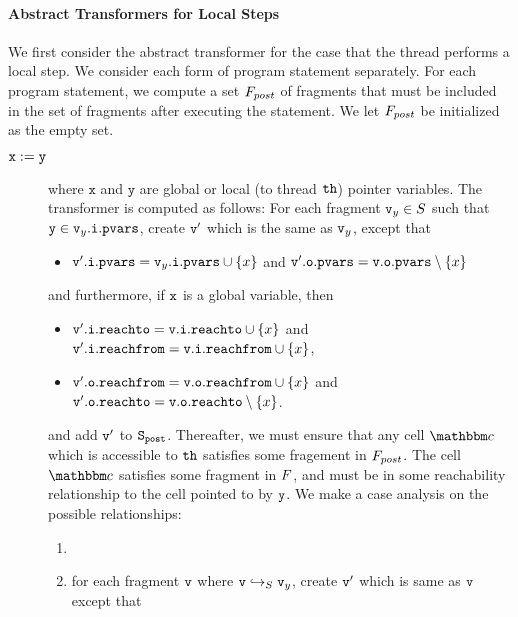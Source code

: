 \paragraph{Abstract Transformers for Local Steps} We first consider
the abstract transformer for the case that the thread performs a local
step.
We consider each form of program statement separately.
For each program statement, we compute a set $F_{post}$  of fragments that
must be included in the set of fragments after executing the statement.
We let $F_{post}$ be initialized as the empty set.
\begin{description}
\item[${\tt x := y}$] where $\mathtt{x}$ and $\mathtt{y}$ are global or local
  (to thread ${\tt th}$) pointer variables.
  The transformer is computed as follows: For each fragment $\mathtt{v}_y \in S$ such that $\mathtt{y} \in \mathtt{v}_y.\mathtt{i}.\mathtt{pvars}$, 
create $\mathtt{v}'$ which is the same as $\mathtt{v}_y$, except that
\begin{itemize}
\item $\mathtt{v}'.\mathtt{i}.\mathtt{pvars} = \mathtt{v}_y.\mathtt{i}.\mathtt{pvars} \cup \left\{x\right\}$ and
  $\mathtt{v}'.\mathtt{o}.\mathtt{pvars} = \mathtt{v}.\mathtt{o}.\mathtt{pvars} \setminus \left\{x\right\}$
\end{itemize}
and furthermore, if $\mathtt{x}$ is a global variable, then
\begin{itemize}
\item $\mathtt{v}'.\mathtt{i}.\mathtt{reachto} = \mathtt{v}.\mathtt{i}.\mathtt{reachto} \cup \left\{x\right\}$ and
$\mathtt{v}'.\mathtt{i}.\mathtt{reachfrom} = \mathtt{v}.\mathtt{i}.\mathtt{reachfrom} \cup \left\{x\right\}$,
\item $\mathtt{v}'.\mathtt{o}.\mathtt{reachfrom} = \mathtt{v}.\mathtt{o}.\mathtt{reachfrom} \cup \left\{x\right\}$ and
$\mathtt{v}'.\mathtt{o}.\mathtt{reachto} = \mathtt{v}.\mathtt{o}.\mathtt{reachto} \setminus \left\{x\right\}$.
\end{itemize}
and add $\mathtt{v}'$ to $\tt S_{post}$.
Thereafter, we must ensure that any cell $\cell$ which is accessible to ${\tt th}$
satisfies some fragement in $F_{post}$. The cell $\cell$ satisfies some
fragment in $F$, and must be in some reachability relationship to
the cell pointed to by $\mathtt{y}$. We make a case analysis on the possible
relationships:
\begin{enumerate}
\item 
\item  for each fragment $\mathtt{v}$ where $\mathtt{v} \hookrightarrow_S \mathtt{v}_y$, create $\mathtt{v}'$ which is same as $\mathtt{v}$ except that

\end{enumerate}
\end{description}
